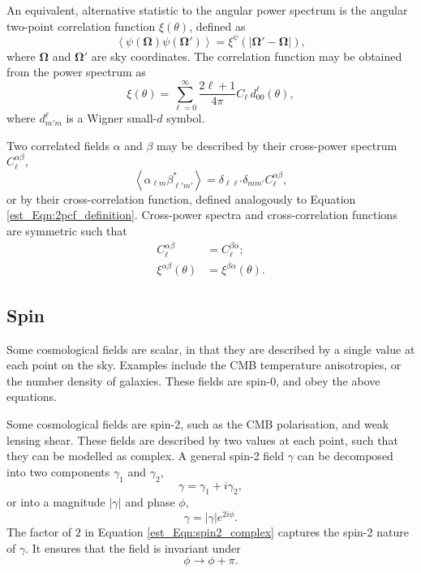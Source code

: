 An equivalent, alternative statistic to the angular power spectrum is the angular two-point correlation function $\xi \left( \theta \right)$, defined as
\begin{equation}
\left\langle \psi \left( \bm{\Omega} \right)
\psi \left( \bm{\Omega'} \right) \right\rangle
= \xi^\psi \left( \left| \bm{\Omega'} - \bm{\Omega} \right| \right),
\label{est_Eqn:2pcf_definition}
\end{equation}
where $\bm{\Omega}$ and $\bm{\Omega'}$ are sky coordinates. The correlation function may be obtained from the power spectrum as
\begin{equation}
\xi \left( \theta \right) = \sum_{\ell = 0}^\infty {
\frac{2 \ell + 1}{4 \pi} C_\ell \,
d^\ell_{00} \left( \theta \right) },
\end{equation}
where $d^\ell_{m' m}$ is a Wigner small-$d$ symbol.

Two correlated fields $\alpha$ and $\beta$ may be described by their cross-power spectrum $C_\ell^{\alpha \beta}$,
\begin{equation}
\left\langle \alpha_{\ell m} \beta^*_{\ell' m'} \right\rangle
= \delta_{\ell \ell'} \delta_{m m'} C_\ell^{\alpha \beta},
\label{est_Eqn:general_cross_cl}
\end{equation}
or by their cross-correlation function, defined analogously to Equation \eqref{est_Eqn:2pcf_definition}. Cross-power spectra and cross-correlation functions are symmetric such that
\begin{align}
C_\ell^{\alpha \beta} &= C_\ell^{\beta \alpha};
\\[1em]
\xi^{\alpha \beta} \left( \theta \right)
&= \xi^{\beta \alpha} \left( \theta \right).
\end{align}

\subsection{Spin}
\label{est_Sec:spin}

Some cosmological fields are scalar, in that they are described by a single value at each point on the sky. Examples include the CMB temperature anisotropies, or the number density of galaxies. These fields are spin-0, and obey the above equations.

Some cosmological fields are spin-2, such as the CMB polarisation, and weak lensing shear. These fields are described by two values at each point, such that they can be modelled as complex. A general spin-2 field $\gamma$ can be decomposed into two components $\gamma_1$ and $\gamma_2$,
\begin{equation}
\gamma = \gamma_1 + i \gamma_2,
\end{equation}
or into a magnitude $\left| \gamma \right|$ and phase $\phi$,
\begin{equation}
\gamma = \left| \gamma \right| e^{2 i \phi}.
\label{est_Eqn:spin2_complex}
\end{equation}
The factor of $2$ in Equation \eqref{est_Eqn:spin2_complex} captures the spin-2 nature of $\gamma$. It ensures that the field is invariant under
\begin{equation}
\phi \rightarrow \phi + \pi.
\end{equation}

